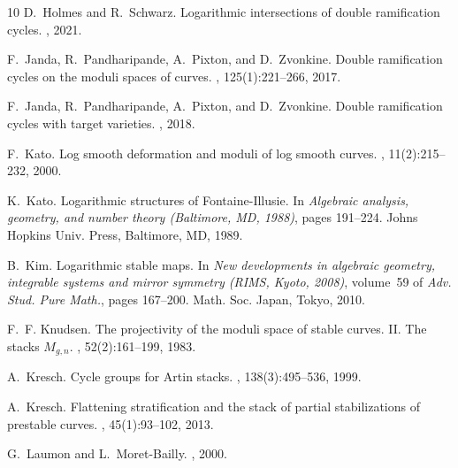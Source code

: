 \documentclass[a4paper,12pt]{article} %
\theoremstyle{definition}
\theoremstyle{plain}%
\begin{document}
\begin{thebibliography}{10}
D.~Holmes and R.~Schwarz.
\newblock Logarithmic intersections of double ramification cycles.
,
  2021.


F.~Janda, R.~Pandharipande, A.~Pixton, and D.~Zvonkine.
\newblock Double ramification cycles on the moduli spaces of curves.
, 125(1):221--266,
  2017.

F.~Janda, R.~Pandharipande, A.~Pixton, and D.~Zvonkine.
\newblock Double ramification cycles with target varieties.
,
  2018.

F.~Kato.
\newblock Log smooth deformation and moduli of log smooth curves.
, 11(2):215--232, 2000.

K.~Kato.
\newblock Logarithmic structures of {F}ontaine-{I}llusie.
\newblock In {\em Algebraic analysis, geometry, and number theory ({B}altimore,
  {MD}, 1988)}, pages 191--224. Johns Hopkins Univ. Press, Baltimore, MD, 1989.

B.~Kim.
\newblock Logarithmic stable maps.
\newblock In {\em New developments in algebraic geometry, integrable systems
  and mirror symmetry ({RIMS}, {K}yoto, 2008)}, volume~59 of {\em Adv. Stud.
  Pure Math.}, pages 167--200. Math. Soc. Japan, Tokyo, 2010.

F.~F. Knudsen.
\newblock The projectivity of the moduli space of stable curves. {II}. {T}he
  stacks {$M_{g,n}$}.
, 52(2):161--199, 1983.

A.~Kresch.
\newblock Cycle groups for {A}rtin stacks.
, 138(3):495--536, 1999.

A.~Kresch.
\newblock Flattening stratification and the stack of partial stabilizations of
  prestable curves.
, 45(1):93--102, 2013.

G.~Laumon and L.~Moret-Bailly.
, 2000.



\end{thebibliography}
\end{document}
